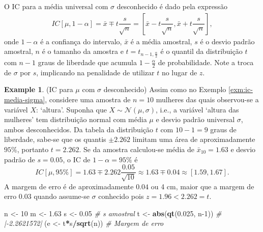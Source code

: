 \documentclass[
]{book}
\newenvironment{Shaded}{\begin{snugshade}}{\end{snugshade}}
\newcommand{\CommentTok}[1]{\textcolor[rgb]{0.56,0.35,0.01}{\textit{#1}}}
\newcommand{\DecValTok}[1]{\textcolor[rgb]{0.00,0.00,0.81}{#1}}
\newcommand{\FloatTok}[1]{\textcolor[rgb]{0.00,0.00,0.81}{#1}}
\newcommand{\KeywordTok}[1]{\textcolor[rgb]{0.13,0.29,0.53}{\textbf{#1}}}
\newcommand{\NormalTok}[1]{#1}
\newcommand{\OperatorTok}[1]{\textcolor[rgb]{0.81,0.36,0.00}{\textbf{#1}}}
\newcommand{\StringTok}[1]{\textcolor[rgb]{0.31,0.60,0.02}{#1}}
\theoremstyle{definition}
\theoremstyle{definition}
\newtheorem{example}{Example}[chapter]
\theoremstyle{definition}
\theoremstyle{remark}
\begin{document}
O IC para a média universal com \(\sigma\) desconhecido é dado pela expressão
\begin{eqnarray}
IC \left[ \mu, 1-\alpha \right] = \bar{x} \mp t \dfrac{s}{\sqrt{n}} = \left[ \bar{x} - t \dfrac{s}{\sqrt{n}}, \bar{x} + t \dfrac{s}{\sqrt{n}} \right],
\label{eq:ic-media-s}
\end{eqnarray}
onde \(1-\alpha\) é a confiança do intervalo, \(\bar{x}\) é a média amostral, \(s\) é o desvio padrão amostral, \(n\) é o tamanho da amostra e \(t=t_{n-1, \frac{\alpha}{2}}\) é o quantil da distribuição \(t\) com \(n-1\) graus de liberdade que acumula \(1-\frac{\alpha}{2}\) de probabilidade. Note a troca de \(\sigma\) por \(s\), implicando na penalidade de utilizar \(t\) no lugar de \(z\).

\begin{example}
\protect\hypertarget{exm:ic-media-s}{}{\label{exm:ic-media-s} }(IC para \(\mu\) com \(\sigma\) desconhecido) Assim como no Exemplo \ref{exm:ic-media-sigma}, considere uma amostra de \(n=10\) mulheres das quais observou-se a variável \(X\): `altura'. Suponha que \(X \sim \mathcal{N}(\mu,\sigma)\), i.e., a variável `altura das mulheres' tem distribuição normal com média \(\mu\) e desvio padrão universal \(\sigma\), ambos desconhecidos. Da tabela da distribuição \(t\) com \(10-1=9\) graus de liberdade, sabe-se que os quantis \(\pm 2.262\) limitam uma área de aproximadamente \(95\%\), portanto \(t=2.262\). Se da amostra calculou-se média de \(\bar{x}_{10} = 1.63\) e desvio padrão de \(s=0.05\), o IC de \(1-\alpha=95\%\) é \[ IC \left[ \mu, 95\% \right] = 1.63 \mp 2.262 \dfrac{0.05}{\sqrt{10}} \approx 1.63 \mp 0.04 \approx \left[ 1.59, 1.67 \right]. \] A margem de erro é de aproximadamente \(0.04\) ou 4 cm, maior que a margem de erro \(0.03\) quando assume-se \(\sigma\) conhecido pois \(z=1.96 < 2.262=t\).
\end{example}

\begin{Shaded}
\begin{Highlighting}[]
\NormalTok{n \textless{}{-}}\StringTok{ }\DecValTok{10}
\NormalTok{m \textless{}{-}}\StringTok{ }\FloatTok{1.63}
\NormalTok{s \textless{}{-}}\StringTok{ }\FloatTok{0.05}                       \CommentTok{\# \textquotesingle{}s\textquotesingle{} amostral}
\NormalTok{t \textless{}{-}}\StringTok{ }\KeywordTok{abs}\NormalTok{(}\KeywordTok{qt}\NormalTok{(}\FloatTok{0.025}\NormalTok{, n}\DecValTok{{-}1}\NormalTok{))        }\CommentTok{\# |{-}2.2621572|}
\NormalTok{(e \textless{}{-}}\StringTok{ }\NormalTok{t}\OperatorTok{*}\NormalTok{s}\OperatorTok{/}\KeywordTok{sqrt}\NormalTok{(n))              }\CommentTok{\# Margem de erro}
\end{Highlighting}
\end{Shaded}
\end{document}
